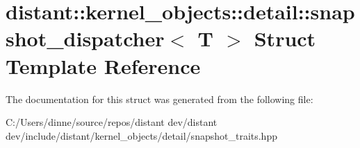 \hypertarget{structdistant_1_1kernel__objects_1_1detail_1_1snapshot__dispatcher}{}\section{distant\+:\+:kernel\+\_\+objects\+:\+:detail\+:\+:snapshot\+\_\+dispatcher$<$ T $>$ Struct Template Reference}
\label{structdistant_1_1kernel__objects_1_1detail_1_1snapshot__dispatcher}


The documentation for this struct was generated from the following file\+:\begin{DoxyCompactItemize}
\item 
C\+:/\+Users/dinne/source/repos/distant dev/distant dev/include/distant/kernel\+\_\+objects/detail/snapshot\+\_\+traits.\+hpp\end{DoxyCompactItemize}
